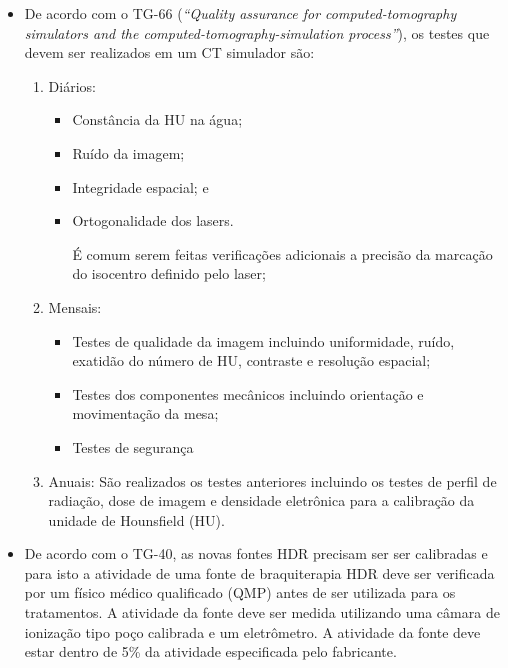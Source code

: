 \documentclass[11pt,a4paper]{article}
\newcounter{exemplo}
\begin{document}
\begin{exemplo}[Qualidade]
\begin{itemize}
        \item De acordo com o TG-66 (\textit{``Quality assurance for computed-tomography simulators and the computed-tomography-simulation process''}), os testes que devem ser realizados em um CT simulador são:
            \begin{enumerate}
                \item Diários:
                    \begin{itemize}[label=\textcolor{CarnationPink}{$\star$}]
                        \item Constância da HU na água;
                        \item Ruído da imagem;
                        \item Integridade espacial; e
                        \item Ortogonalidade dos lasers.
                        
                        É comum serem feitas verificações adicionais a precisão da marcação do isocentro definido pelo laser;
                    \end{itemize}

                \item Mensais:
                    \begin{itemize}[label=\textcolor{CarnationPink}{$\star$}]
                        \item Testes de qualidade da imagem incluindo uniformidade, ruído, exatidão do número de HU, contraste e resolução espacial;
                        \item Testes dos componentes mecânicos incluindo orientação e movimentação da mesa;
                        \item Testes de segurança
                    \end{itemize}

                \item Anuais: São realizados os testes anteriores incluindo os testes de perfil de radiação, dose de imagem e densidade eletrônica para a calibração da unidade de Hounsfield (HU).
            \end{enumerate}

        \item De acordo com o TG-40, as novas fontes HDR precisam ser ser calibradas e para isto a atividade de uma fonte de braquiterapia HDR deve ser verificada por um físico médico qualificado (QMP) antes de ser utilizada para os tratamentos. A atividade da fonte deve ser medida utilizando uma câmara de ionização tipo poço calibrada e um eletrômetro. A atividade da fonte deve estar dentro de 5\% da atividade especificada pelo fabricante.


\end{itemize}
\end{exemplo}
\end{document}
